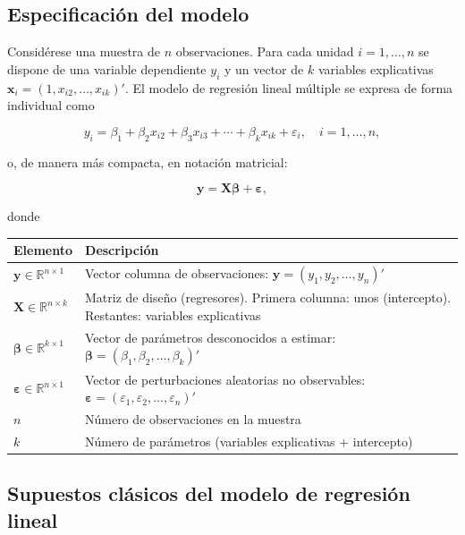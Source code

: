 \documentclass[11pt,a4paper]{article}
\begin{document}
\subsection{Especificación del modelo}

Considérese una muestra de \(n\) observaciones. Para cada unidad \(i = 1, \dots, n\) se dispone de una variable dependiente \(y_i\) y un vector de \(k\) variables explicativas \(\mathbf{x}_i = (1, x_{i2}, \dots, x_{ik})'\). El modelo de regresión lineal múltiple se expresa de forma individual como

\[
\boxed{y_i = \beta_1 + \beta_2 x_{i2} + \beta_3 x_{i3} + \cdots + \beta_k x_{ik} + \varepsilon_i, \quad i=1,\dots,n},
\]

o, de manera más compacta, en notación matricial:

\[
\boxed{\mathbf{y} = \mathbf{X}\boldsymbol{\beta} + \boldsymbol{\varepsilon}},
\]

donde

\begin{table}[H]
\centering
\renewcommand{\arraystretch}{1.8}
\begin{tabular}{@{}|l|p{7cm}|@{}}
\hline
\textbf{Elemento} & \textbf{Descripción} \\
\hline\hline
\(\mathbf{y} \in \mathbb{R}^{n \times 1}\) & Vector columna de observaciones: \(\mathbf{y} = (y_1, y_2, \dots, y_n)'\) \\
\hline
\(\mathbf{X} \in \mathbb{R}^{n \times k}\) & Matriz de diseño (regresores). Primera columna: unos (intercepto). Restantes: variables explicativas \\
\hline
\(\boldsymbol{\beta} \in \mathbb{R}^{k \times 1}\) & Vector de parámetros desconocidos a estimar: \(\boldsymbol{\beta} = (\beta_1, \beta_2, \dots, \beta_k)'\) \\
\hline
\(\boldsymbol{\varepsilon} \in \mathbb{R}^{n \times 1}\) & Vector de perturbaciones aleatorias no observables: \(\boldsymbol{\varepsilon} = (\varepsilon_1, \varepsilon_2, \dots, \varepsilon_n)'\) \\
\hline
\(n\) & Número de observaciones en la muestra \\
\hline
\(k\) & Número de parámetros (variables explicativas + intercepto) \\
\hline
\end{tabular}
\end{table}

\subsection{Supuestos clásicos del modelo de regresión lineal}
\end{document}
